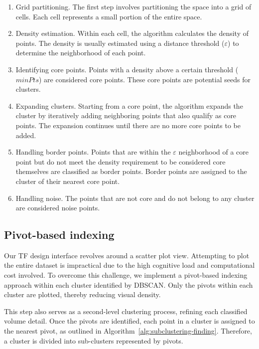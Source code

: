 \begin{enumerate}
    \item Grid partitioning. The first step involves partitioning the space into a grid of cells. Each cell represents a small portion of the entire space.

    \item Density estimation. Within each cell, the algorithm calculates the density of points. The density is usually estimated using a distance threshold ($\varepsilon$) to determine the neighborhood of each point.

    \item Identifying core points. Points with a density above a certain threshold ($minPts$) are considered core points. These core points are potential seeds for clusters.

    \item Expanding clusters. Starting from a core point, the algorithm expands the cluster by iteratively adding neighboring points that also qualify as core points. The expansion continues until there are no more core points to be added.

    \item Handling border points. Points that are within the $\varepsilon$ neighborhood of a core point but do not meet the density requirement to be considered core themselves are classified as border points. Border points are assigned to the cluster of their nearest core point.

    \item Handling noise. The points that are not core and do not belong to any cluster are considered noise points.
\end{enumerate}

\subsection{Pivot-based indexing}
\label{subsect:pivot-based-indexing}

Our TF design interface revolves around a scatter plot view. Attempting to plot the entire dataset is impractical due to the high cognitive load and computational cost involved. To overcome this challenge, we implement a pivot-based indexing approach within each cluster identified by DBSCAN. Only the pivots within each cluster are plotted, thereby reducing visual density.

This step also serves as a second-level clustering process, refining each classified volume detail. Once the pivots are identified, each point in a cluster is assigned to the nearest pivot, as outlined in Algorithm~\ref{alg:subclustering-finding}. Therefore, a cluster is divided into sub-clusters represented by pivots.

